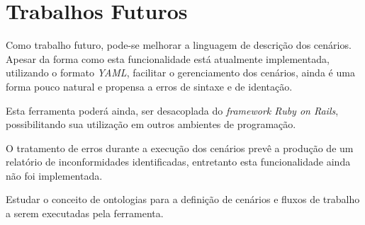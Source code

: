 \section{Trabalhos Futuros}

Como trabalho futuro, pode-se melhorar a linguagem de descrição dos cenários. Apesar da forma como esta funcionalidade está atualmente implementada, utilizando o formato \textit{YAML}, facilitar o gerenciamento dos cenários, ainda é uma forma pouco natural e propensa a erros de sintaxe e de identação.

Esta ferramenta poderá ainda, ser desacoplada do \textit{framework Ruby on Rails}, possibilitando sua utilização em outros ambientes de programação.

O tratamento de erros durante a execução dos cenários prevê a produção de um relatório de inconformidades identificadas, entretanto esta funcionalidade ainda não foi implementada.

Estudar o conceito de ontologias para a definição de cenários e fluxos de trabalho a serem executadas pela ferramenta.